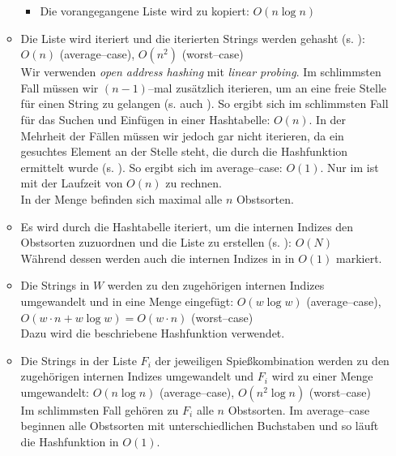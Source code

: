 \begin{itemize}
\begin{itemize}
\begin{itemize}
      \item Die vorangegangene Liste wird zu  kopiert: $O(n \log n)$
    \end{itemize}

    \item Die Liste  wird iteriert und die iterierten Strings werden gehasht (s. ): $O(n)$ (average--case), $O(n^2)$ (worst--case)\\
    Wir verwenden \textit{open address hashing} mit \textit{linear probing}.
    Im schlimmsten Fall müssen wir $(n - 1)$--mal zusätzlich iterieren, um an eine freie Stelle für einen
    String zu gelangen (s. auch ).
    So ergibt sich im schlimmsten Fall für das Suchen und Einfügen in einer Hashtabelle: $O(n)$.
    In der Mehrheit der Fällen müssen wir jedoch gar nicht iterieren, da ein gesuchtes Element
    an der Stelle steht, die durch die Hashfunktion ermittelt wurde (s. ).
    So ergibt sich im average--case: $O(1)$.
    Nur im  ist mit der Laufzeit von $O(n)$ zu rechnen.\\
    In der Menge  befinden sich maximal alle $n$ Obstsorten.

    \item Es wird durch die Hashtabelle iteriert, um die internen Indizes den Obstsorten zuzuordnen
    und die Liste  zu erstellen (s. ): $O(N)$\\
    Während dessen werden auch die internen Indizes in  in $O(1)$ markiert.

    \item Die Strings in $W$ werden zu den zugehörigen internen Indizes umgewandelt und in eine Menge eingefügt:
    $O(w \log w)$ (average--case), $O(w \cdot n + w \log w) = O(w \cdot n)$ (worst--case)\\
    Dazu wird die beschriebene Hashfunktion verwendet.

    \item Die Strings in der Liste $F_i$ der jeweiligen Spießkombination werden
    zu den zugehörigen internen Indizes umgewandelt und $F_i$ wird zu einer Menge umgewandelt:
    $O(n \log n)$ (average--case), $O(n^2 \log n)$ (worst--case)\\
    Im schlimmsten Fall gehören zu $F_i$ alle $n$ Obstsorten. 
    Im average--case beginnen alle Obstsorten mit unterschiedlichen Buchstaben und
    so läuft die Hashfunktion in $O(1)$.


\end{itemize}
\end{itemize}
